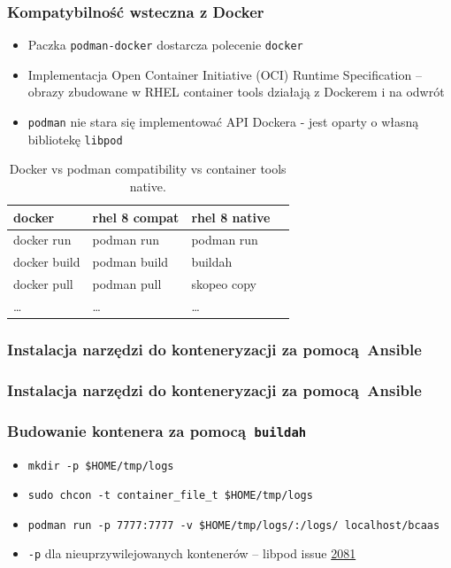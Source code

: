 \documentclass[dvipsnames,table]{beamer}
\begin{document}
\begin{frame}
	\frametitle{Kompatybilność wsteczna z Docker}
	\begin{itemize}
		\item Paczka {\tt podman-docker} dostarcza polecenie {\tt docker}
		\item Implementacja Open Container Initiative (OCI) Runtime Specification -- obrazy zbudowane w RHEL container tools działają z Dockerem i na odwrót
		\item {\tt podman} nie stara się implementować API Dockera - jest oparty o własną bibliotekę {\tt libpod}
	\end{itemize}
\centering
	\begin{table}
\caption{Docker vs podman compatibility vs container tools native.}
\label{porownanie}
\scriptsize
\begin{tabular}{llll}
\hline
docker & rhel 8 compat & rhel 8 native   \\ \hline
	docker run & podman run & podman run \\
	docker build & podman build & buildah  \\
	docker pull & podman pull & skopeo copy \\ 
	\ldots & \ldots & \ldots \\ \hline
\end{tabular}
\normalsize
\end{table}
\end{frame}

\begin{frame}[fragile]
	\frametitle{Instalacja narzędzi do konteneryzacji za pomocą Ansible}
%	
\end{frame}

\begin{frame}[fragile]
	\frametitle{Instalacja narzędzi do konteneryzacji za pomocą Ansible}
%	
\end{frame}

\begin{frame}[fragile]
	\frametitle{Budowanie kontenera za pomocą {\tt buildah}}
%
\begin{itemize}
	\item {\tt mkdir -p \$HOME/tmp/logs}
	\item {\tt sudo chcon -t container\_file\_t \$HOME/tmp/logs}
	\item {\tt podman run -p 7777:7777 -v \$HOME/tmp/logs/:/logs/ localhost/bcaas}
	\item {\tt -p} dla nieuprzywilejowanych kontenerów -- libpod issue \href{https://github.com/containers/libpod/issues/2081}{2081}
\end{itemize}
\end{frame}
\end{document}
